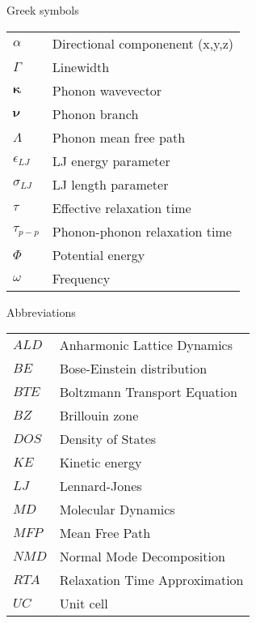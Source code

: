 Greek symbols\\
\begin{longtable}{ l l }
$\alpha$ & Directional componenent (x,y,z)\\
$\Gamma$ & Linewidth\\
$\pmb{\kappa}$ & Phonon wavevector\\ 
$\pmb{\nu}$ & Phonon branch\\
$\Lambda$ & Phonon mean free path\\
$\epsilon_{LJ}$ & LJ energy parameter\\
$\sigma_{LJ}$ & LJ length parameter\\
$\tau$ & Effective relaxation time\\ 
$\tau_{p-p}$ & Phonon-phonon relaxation time\\ 
$\Phi$ & Potential energy\\
$\omega$ & Frequency\\
\end{longtable}

Abbreviations\\
\begin{longtable}{ l l }
$ALD$ & Anharmonic Lattice Dynamics \\
$BE$ & Bose-Einstein distribution \\
$BTE$ & Boltzmann Transport Equation \\
$BZ$ & Brillouin zone \\
$DOS$ & Density of States \\
$KE$ & Kinetic energy\\
$LJ$ & Lennard-Jones\\
$MD$ & Molecular Dynamics\\
$MFP$ & Mean Free Path\\
$NMD$ & Normal Mode Decomposition\\
$RTA$ & Relaxation Time Approximation\\
$UC$ & Unit cell\\
\end{longtable}
